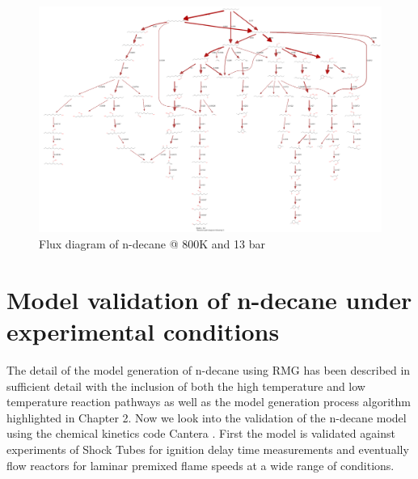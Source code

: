 \begin{figure}[!htp]
    \centering
\hspace*{-3cm}
    \includegraphics[scale=0.35,keepaspectratio]{images/nc10-rxn-path-800K.png}
    \caption{Flux diagram of n-decane @ 800K and 13 bar}
    \label{fig:f2}
\end{figure}


\newpage

\section{Model validation of n-decane under experimental conditions}
The detail of the model generation of n-decane using RMG has been described in sufficient detail with the inclusion of both the high temperature and low temperature reaction pathways as well as the model generation process algorithm highlighted in Chapter 2. Now we look into the validation of the n-decane model using the chemical kinetics code Cantera \cite{cantera}. First the model is validated against experiments of Shock Tubes for ignition delay time measurements and eventually flow reactors for laminar premixed flame speeds at a wide range of conditions.


